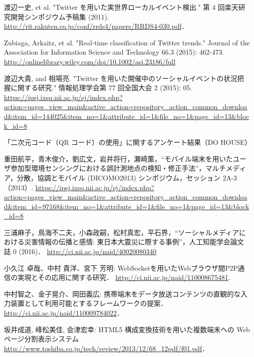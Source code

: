 \begin{thebibliography}{99}

        渡辺一史, et al. "Twitter を用いた実世界ローカルイベント検出." 第 4 回楽天研究開発シンポジウム予稿集 (2011).
        \url{http://rit.rakuten.co.jp/conf/rrds4/papers/RRDS4-030.pdf}．

        Zubiaga, Arkaitz, et al. "Real‐time classification of Twitter trends." Journal of the Association for Information Science and Technology 66.3 (2015): 462-473.
        \url{http://onlinelibrary.wiley.com/doi/10.1002/asi.23186/full}

        渡辺大貴, and 相場亮. "Twitter を用いた開催中のソーシャルイベントの状況把握に関する研究." 情報処理学会第 77 回全国大会 2 (2015): 05.
        \url{https://ipsj.ixsq.nii.ac.jp/ej/index.php?action=pages_view_main&active_action=repository_action_common_download&item_id=144025&item_no=1&attribute_id=1&file_no=1&page_id=13&block_id=8}

        「二次元コード（QR コード）の使用」に関するアンケート結果（DO HOUSE）

        重田航平，青木俊介，劉広文，岩井将行，瀬崎薫，“モバイル端末を用いたユーザ参加型環境センシングにおける誤計測地点の検知・修正手法”，マルチメディア，分散，協調とモバイル (DICOMO2013) シンポジウム，セッション 2A-3（2013）.
         \url{https://ipsj.ixsq.nii.ac.jp/ej/index.php?action=pages_view_main&active_action=repository_action_common_download&item_id=97168&item_no=1&attribute_id=1&file_no=1&page_id=13&block_id=8}

         三浦麻子，鳥海不二夫，小森政嗣，松村真宏，平石界，“ソーシャルメディアにおける災害情報の伝播と感情: 東日本大震災に際する事例”，人工知能学会論文誌 0 (2016)．
         \url{http://ci.nii.ac.jp/naid/40020080340}

        小久江 卓哉、中村 貴洋、宮下 芳明:
        WebSocketを用いたWebブラウザ間P2P通信の実現とその応用に関する研究．
        \url{http://ci.nii.ac.jp/naid/110008675481}.

        中村智之、金子晃介、岡田義広:
        携帯端末をデータ放送コンテンツの直観的な入力装置として利用可能とするフレームワークの提案．
        \url{http://ci.nii.ac.jp/naid/110009784022}．

        坂井成道, 峰松美佳, 会津宏幸:
        HTML5 構成変換技術を用いた複数端末への Web ページ分割表示システム
        \url{http://www.toshiba.co.jp/tech/review/2013/12/68_12pdf/f01.pdf}．


\end{thebibliography}
